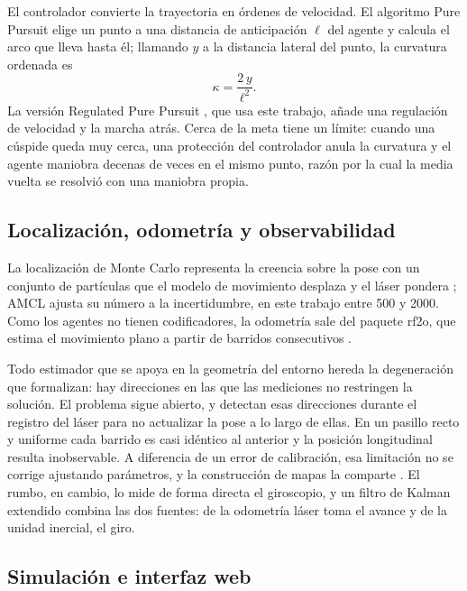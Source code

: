 El controlador convierte la trayectoria en órdenes de velocidad. El algoritmo Pure Pursuit elige un punto a una distancia de anticipación $\ell$ del agente y calcula el arco que lleva hasta él; llamando $y$ a la distancia lateral del punto, la curvatura ordenada es
\begin{equation}
  \kappa = \frac{2\,y}{\ell^{2}} .
\end{equation}
La versión Regulated Pure Pursuit \autocite{macenski2023rpp}, que usa este trabajo, añade una regulación de velocidad y la marcha atrás. Cerca de la meta tiene un límite: cuando una cúspide queda muy cerca, una protección del controlador anula la curvatura y el agente maniobra decenas de veces en el mismo punto, razón por la cual la media vuelta se resolvió con una maniobra propia.

\subsection{Localización, odometría y observabilidad}

La localización de Monte Carlo representa la creencia sobre la pose con un conjunto de partículas que el modelo de movimiento desplaza y el láser pondera \autocite{thrun2005probabilistic}; AMCL ajusta su número a la incertidumbre, en este trabajo entre 500 y 2000. Como los agentes no tienen codificadores, la odometría sale del paquete rf2o, que estima el movimiento plano a partir de barridos consecutivos \autocite{jaimez2016planar}.

Todo estimador que se apoya en la geometría del entorno hereda la degeneración que \textcite{zhang2016degeneracy} formalizan: hay direcciones en las que las mediciones no restringen la solución. El problema sigue abierto, y \textcite{tuna2024xicp} detectan esas direcciones durante el registro del láser para no actualizar la pose a lo largo de ellas. En un pasillo recto y uniforme cada barrido es casi idéntico al anterior y la posición longitudinal resulta inobservable. A diferencia de un error de calibración, esa limitación no se corrige ajustando parámetros, y la construcción de mapas la comparte \autocite{macenski2021slam}. El rumbo, en cambio, lo mide de forma directa el giroscopio, y un filtro de Kalman extendido \autocite{moore2014generalized} combina las dos fuentes: de la odometría láser toma el avance y de la unidad inercial, el giro.

\subsection{Simulación e interfaz web}

